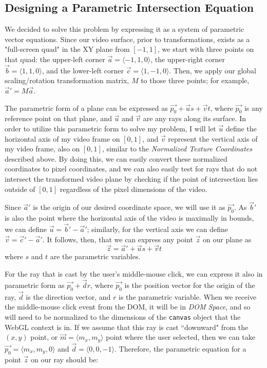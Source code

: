 \subsection{Designing a Parametric Intersection Equation}
    We decided to solve this problem by expressing it as a system of parametric vector equations. Since our video surface, prior to transformations, exists as a "full-screen quad" in the XY plane from $[-1,1]$, we start with three points on that quad: the upper-left corner $\vec{a}=\langle-1,1,0\rangle$, the upper-right corner $\vec{b}=\langle1,1,0\rangle$, and the lower-left corner $\vec{c}=\langle1,-1,0\rangle$. Then, we apply our global scaling/rotation transformation matrix, $M$ to those three points; for example, $\vec{a}'=M\vec{a}$.\par
    The parametric form of a plane can be expressed as $\vec{p_0}+\vec{u}s+\vec{v}t$, where $\vec{p_0}$ is any reference point on that plane, and $\vec{u}$ and $\vec{v}$ are any rays along its surface. In order to utilize this parametric form to solve my problem, I will let $\vec{u}$ define the horizontal axis of my video frame on $[0,1]$, and $\vec{v}$ represent the vertical axis of my video frame, also on $[0,1]$, similar to the \emph{Normalized Texture Coordinates} described above. By doing this, we can easily convert these normalized coordinates to pixel coordinates, and we can also easily test for rays that do not intersect the transformed video plane by checking if the point of intersection lies outside of $[0,1]$ regardless of the pixel dimensions of the video.\par
    Since $\vec{a}'$ is the origin of our desired coordinate space, we will use it as $\vec{p_0}$. As $\vec{b}'$ is also the point where the horizontal axis of the video is maximally in bounds, we can define $\vec{u}=\vec{b}'-\vec{a}'$; similarly, for the vertical axis we can define $\vec{v}=\vec{c}'-\vec{a}'$. It follows, then, that we can express any point $\vec{z}$ on our plane as
    \begin{equation}
    \vec{z}=\vec{a}'+\vec{u}s+\vec{v}t
    \end{equation}
where $s$ and $t$ are the parametric variables.\par
    For the ray that is cast by the user's middle-mouse click, we can express it also in parametric form as $\vec{p_0}+\vec{d}r$, where $\vec{p_0}$ is the position vector for the origin of the ray, $\vec{d}$ is the direction vector, and $r$ is the parametric variable. When we receive the middle-mouse click event from the DOM, it will be in \emph{DOM Space}, and so will need to be normalized to the dimensions of the \texttt{canvas} object that the WebGL context is in. If we assume that this ray is cast ``downward" from the $(x,y)$ point, or $\vec{m}=\langle m_x, m_y \rangle$ point where the user selected, then we can take $\vec{p_0}=\langle m_x, m_y, 0 \rangle$ and $\vec{d}=\langle 0, 0, -1 \rangle$. Therefore, the parametric equation for a point $\vec{z}$ on our ray should be:
